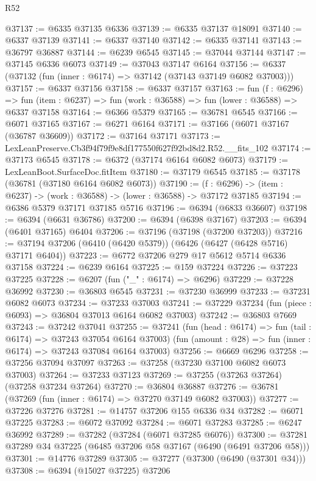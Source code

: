 \begin{lexlean}{R52}
\begin{coremodule}
@37137 := @6335 @37135 @6336
@37139 := @6335 @37137 @18091
@37140 := @6337 @37139
@37141 := @6337 @37140
@37142 := @6335 @37141
@37143 := @36797 @36887
@37144 := @6239 @6545
@37145 := @37044 @37144
@37147 := @37145 @6336 @6073
@37149 := @37043 @37147 @6164
@37156 := @6337 (@37132 (fun (inner : @6174) => @37142 (@37143 @37149 @6082 @37003)))
@37157 := @6337 @37156
@37158 := @6337 @37157
@37163 := fun (f : @6296) =>
  fun (item : @6237) => fun (work : @36588) => fun (lower : @36588) => @6337 @37158
@37164 := @6366 @5379
@37165 := @36781 @6545
@37166 := @6071 @37165
@37167 := @6271 @6164
@37171 := @37166 (@6071 @37167 (@36787 @36609))
@37172 := @37164 @37171
@37173 := LexLeanPreserve.Cb3f94f79f9e8df177550f627f92bd8d2.R52.__fits_102
@37174 := @37173 @6545
@37178 := @6372 (@37174 @6164 @6082 @6073)
@37179 := LexLeanBoot.SurfaceDoc.fitItem
@37180 := @37179 @6545
@37185 := @37178 (@36781 (@37180 @6164 @6082 @6073))
@37190 := (f : @6296) -> (item : @6237) -> (work : @36588) -> (lower : @36588) -> @37172 @37185
@37194 := @6386 @5379 @37171 @37185 @5716
@37196 := @6394 (@6833 @36607)
@37198 := @6394 (@6631 @36786)
@37200 := @6394 (@6398 @37167)
@37203 := @6394 (@6401 @37165) @6404
@37206 := @37196 (@37198 (@37200 @37203))
@37216 := @37194 @37206 (@6410 (@6420 @5379)) (@6426 (@6427 (@6428 @5716) @37171 @6404))
@37223 := @6772 @37206 @279 @17 @5612 @5714 @6336 @37158
@37224 := @6239 @6164
@37225 := @159 @37224
@37226 := @37223 @37225
@37228 := @6207 (fun ("_" : @6174) => @6296)
@37229 := @37228 @36992
@37230 := @36803 @6545
@37231 := @37230 @36999
@37233 := @37231 @6082 @6073
@37234 := @37233 @37003
@37241 := @37229 @37234 (fun (piece : @6093) => @36804 @37013 @6164 @6082 @37003)
@37242 := @36803 @7669
@37243 := @37242 @37041
@37255 := @37241
    (fun (head : @6174) => fun (tail : @6174) => @37243 @37054 @6164 @37003)
    (fun (amount : @28) => fun (inner : @6174) => @37243 @37084 @6164 @37003)
@37256 := @6669 @6296
@37258 := @37256 @37094 @37097
@37263 := @37258 (@37230 @37100 @6082 @6073 @37003)
@37264 := @37233 @37123
@37269 := @37255 (@37263 @37264) (@37258 @37234 @37264)
@37270 := @36804 @36887
@37276 := @36781 (@37269 (fun (inner : @6174) => @37270 @37149 @6082 @37003))
@37277 := @37226 @37276
@37281 := @14757 @37206 @155 @6336 @34
@37282 := @6071 @37225
@37283 := @6072 @37092
@37284 := @6071 @37283
@37285 := @6247 @36992
@37289 := @37282 (@37284 (@6071 @37285 @6076))
@37300 := @37281 @37289 @34 @37225 (@6485 @37206 @58 @37167 (@6490 (@6491 @37206 @58)))
@37301 := @14776 @37289
@37305 := @37277 (@37300 (@6490 (@37301 @34)))
@37308 := @6394 (@15027 @37225) @37206

\end{coremodule}
\end{lexlean}

